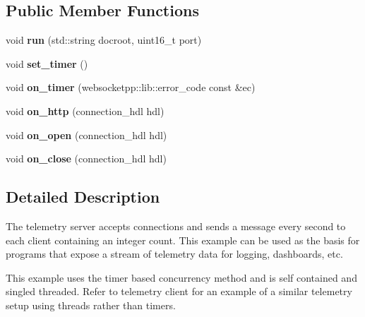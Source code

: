 \subsection*{Public Member Functions}
\begin{DoxyCompactItemize}
\item 
void {\bfseries run} (std\+::string docroot, uint16\+\_\+t port)\hypertarget{classtelemetry__server_a8c09eba40e8993079859e9f1974254ab}{}\label{classtelemetry__server_a8c09eba40e8993079859e9f1974254ab}

\item 
void {\bfseries set\+\_\+timer} ()\hypertarget{classtelemetry__server_a2a510e3a3c91c123f37d95d7b7d140ea}{}\label{classtelemetry__server_a2a510e3a3c91c123f37d95d7b7d140ea}

\item 
void {\bfseries on\+\_\+timer} (websocketpp\+::lib\+::error\+\_\+code const \&ec)\hypertarget{classtelemetry__server_acc29e40bd4262e42b3d16e4fcd79ec22}{}\label{classtelemetry__server_acc29e40bd4262e42b3d16e4fcd79ec22}

\item 
void {\bfseries on\+\_\+http} (connection\+\_\+hdl hdl)\hypertarget{classtelemetry__server_abab5c8572db5f87e745b862e59867bc8}{}\label{classtelemetry__server_abab5c8572db5f87e745b862e59867bc8}

\item 
void {\bfseries on\+\_\+open} (connection\+\_\+hdl hdl)\hypertarget{classtelemetry__server_a3f0a1ba79c9d32843a4acca8a187bf17}{}\label{classtelemetry__server_a3f0a1ba79c9d32843a4acca8a187bf17}

\item 
void {\bfseries on\+\_\+close} (connection\+\_\+hdl hdl)\hypertarget{classtelemetry__server_aab83aa8df38767bd2271dd775e6c3f0e}{}\label{classtelemetry__server_aab83aa8df38767bd2271dd775e6c3f0e}

\end{DoxyCompactItemize}


\subsection{Detailed Description}
The telemetry server accepts connections and sends a message every second to each client containing an integer count. This example can be used as the basis for programs that expose a stream of telemetry data for logging, dashboards, etc.

This example uses the timer based concurrency method and is self contained and singled threaded. Refer to telemetry client for an example of a similar telemetry setup using threads rather than timers.

